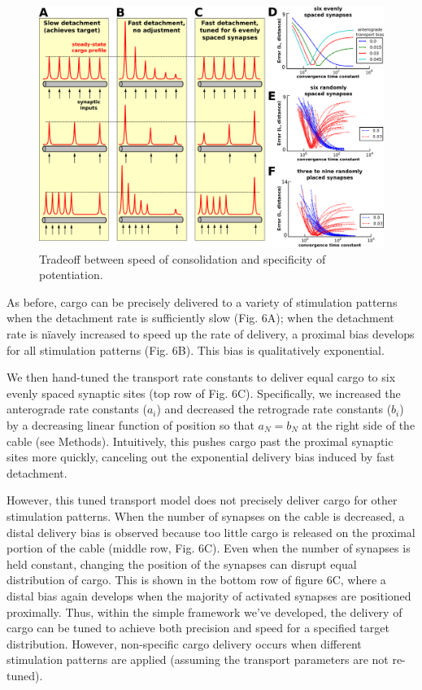 \documentclass[10pt]{wlpeerj}
\begin{document}
\begin{figure}[!tb]
\begin{center}
\includegraphics[width=0.9\columnwidth]{06_heterosynaptic_cable.png}
\caption{Tradeoff between speed of consolidation and specificity of potentiation.}
\end{center}
\end{figure}

As before, cargo can be precisely delivered to a variety of stimulation patterns when the detachment rate is sufficiently slow (Fig. 6A); when the detachment rate is n\"iavely increased to speed up the rate of delivery, a proximal bias develops for all stimulation patterns (Fig. 6B).
This bias is qualitatively exponential.

We then hand-tuned the transport rate constants to deliver equal cargo to six evenly spaced synaptic sites (top row of Fig. 6C).
Specifically, we increased the anterograde rate constants ($a_i$) and decreased the retrograde rate constants ($b_i$) by a decreasing linear function of position so that $a_N = b_N$ at the right side of the cable (see Methods).
Intuitively, this pushes cargo past the proximal synaptic sites more quickly, canceling out the exponential delivery bias induced by fast detachment.

However, this tuned transport model does not precisely deliver cargo for other stimulation patterns.
When the number of synapses on the cable is decreased, a distal delivery bias is observed because too little cargo is released on the proximal portion of the cable (middle row, Fig. 6C).
Even when the number of synapses is held constant, changing the position of the synapses can disrupt equal distribution of cargo. This is shown in the bottom row of figure 6C, where a distal bias again develops when the majority of activated synapses are positioned proximally.
Thus, within the simple framework we've developed, the delivery of cargo can be tuned to achieve both precision and speed for a specified target distribution.
However, non-specific cargo delivery occurs when different stimulation patterns are applied (assuming the transport parameters are not re-tuned).
\end{document}
